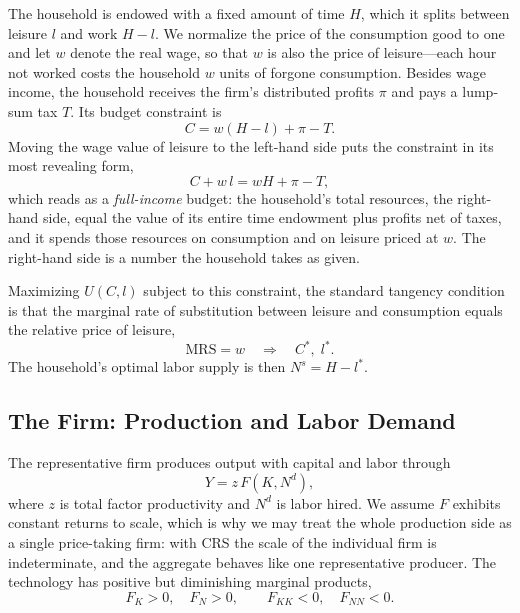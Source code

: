 The household is endowed with a fixed amount of time $H$, which it splits between leisure $l$ and work $H - l$. We normalize the price of the consumption good to one and let $w$ denote the real wage, so that $w$ is also the price of leisure---each hour not worked costs the household $w$ units of forgone consumption. Besides wage income, the household receives the firm's distributed profits $\pi$ and pays a lump-sum tax $T$. Its budget constraint is
\[
C = w(H - l) + \pi - T.
\]
Moving the wage value of leisure to the left-hand side puts the constraint in its most revealing form,
\[
C + w\,l = wH + \pi - T,
\]
which reads as a \emph{full-income} budget: the household's total resources, the right-hand side, equal the value of its entire time endowment plus profits net of taxes, and it spends those resources on consumption and on leisure priced at $w$. The right-hand side is a number the household takes as given.

Maximizing $U(C,l)$ subject to this constraint, the standard tangency condition is that the marginal rate of substitution between leisure and consumption equals the relative price of leisure,
\[
\mathrm{MRS} = w \quad\Longrightarrow\quad C^*,\; l^*.
\]
The household's optimal labor supply is then $N^s = H - l^*$.

\subsection{The Firm: Production and Labor Demand}

The representative firm produces output with capital and labor through
\[
Y = z\,F(K, N^d),
\]
where $z$ is total factor productivity and $N^d$ is labor hired. We assume $F$ exhibits constant returns to scale, which is why we may treat the whole production side as a single price-taking firm: with CRS the scale of the individual firm is indeterminate, and the aggregate behaves like one representative producer. The technology has positive but diminishing marginal products,
\[
F_K > 0, \quad F_N > 0, \qquad F_{KK} < 0, \quad F_{NN} < 0.
\]


